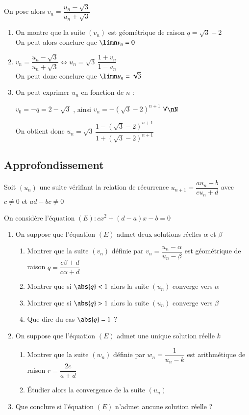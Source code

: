 \documentclass[oneside,12pt]{article}          %
\begin{document}
On pose alors $v_n = \dfrac{u_n - \sqrt{3}}{u_n + \sqrt{3}}$

\begin{enumerate}
	\item On montre que la suite $(v_n)$ est géométrique de raison $q = \sqrt{3} - 2$\\
	On peut alors conclure que $\limn v_n = 0$
	
	\item $v_n = \dfrac{u_n - \sqrt{3}}{u_n + \sqrt{3}} \iff u_n = \sqrt{3} \, \dfrac{1 + v_n}{1 - v_n}$ \\
	On peut donc conclure que $\limn u_n = \sqrt{3}$
	
	\item On peut exprimer $u_n$ en fonction de $n$ : 
	
	$v_0 = -q = 2-\sqrt{3}$ , \quad ainsi $v_n = -(\sqrt{3}-2)^{n+1}$ \quad $\forall\nN$
	
	On obtient donc $u_n = \sqrt{3} \, \dfrac{1 - (\sqrt{3} - 2)^{n+1}}{1 + (\sqrt{3} - 2)^{n+1}}$
\end{enumerate}



\subsection{Approfondissement}
Soit $(u_n)$ une suite vérifiant la relation de récurrence $u_{n+1} = \dfrac{au_n+b}{cu_n+d}$ \quad avec $c \neq0$ et $ad-bc \neq0$

On considère l'équation $(E) : cx^2+(d-a)x -b = 0$

\begin{enumerate}
	\item On suppose que l'équation $(E)$ admet deux solutions réelles $\alpha$ et $\beta$
	\begin{enumerate}
		\item Montrer que la suite $(v_n)$ définie par $v_n = \dfrac{u_n-\alpha}{u_n-\beta}$ est géométrique de raison $q = \dfrac{c\beta+d}{c\alpha+d}$
		\item Montrer que si $\abs{q} < 1$ alors la suite $(u_n)$ converge vers $\alpha$
		\item Montrer que si $\abs{q} > 1$ alors la suite $(u_n)$ converge vers $\beta$
		\item Que dire du cas $\abs{q} = 1$ ?
	\end{enumerate}
	
	\item On suppose que l'équation $(E)$ admet une unique solution réelle $k$
	\begin{enumerate}
		\item Montrer que la suite $(w_n)$ définie par $w_n = \dfrac{1}{u_n-k}$ est arithmétique de raison $r = \dfrac{2c}{a+d}$
		\item Étudier alors la convergence de la suite $(u_n)$
	\end{enumerate}
	
	\item Que conclure si l'équation $(E)$ n'admet aucune solution réelle ?
\end{enumerate}
\end{document}

